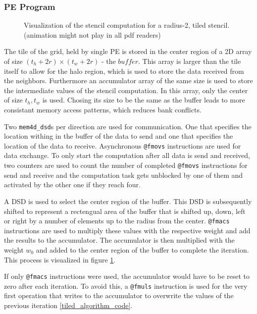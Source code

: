 \documentclass{article}
\begin{document}
\subsubsection{PE Program}

\begin{figure}
    \centering
    \caption{Visualization of the stencil computation for a radius-2, tiled stencil. (animation might not play in all pdf readers)}
    \label{fig:stencil_algorithm_animation}
\end{figure}

The tile of the grid, held by single PE is stored in the center region of a 2D array of size $(t_h+2r)\times (t_w+2r)$ - the $buffer$. This array is larger than the tile itself to allow for the halo region, which is used to store the data received from the neighbors. Furthermore an accumulator array of the same size is used to store the intermediate values of the stencil computation. In this array, only the center of size $t_h, t_w$ is used. Chosing its size to be the same as the buffer leads to more consistant memory access patterns, which reduces bank conflicts.

Two \texttt{mem4d\_dsd}s per direction are used for communication. One that specifies the location withing in the buffer of the data to send and one that specifies the location of the data to receive.
Asynchronous \texttt{@fmovs} instructions are used for data exchange. To only start the computation after all data is send and received, two counters are used to count the number of completed \texttt{@fmovs} instructions for send and receive and the computation task gets unblocked by one of them and activated by the other one if they reach four.

A DSD is used to select the center region of the buffer. This DSD is subsequently shifted to represent a rectengual area of the buffer that is shifted up, down, left or right by a number of elements up to the radius from the center. \texttt{@fmacs} instructions are used to multiply these values with the respective weight and add the results to the accumulator. The accumulator is then multiplied with the weight $w_0$ and added to the center region of the buffer to complete the iteration. This process is visualized in figure \ref{fig:stencil_algorithm_animation}.

If only \texttt{@fmacs} instructions were used, the accumulator would have to be reset to zero after each iteration. To avoid this, a \texttt{@fmuls} instruction is used for the very first operation that writes to the accumulator to overwrite the values of the previous iteration \ref{tiled_algorithm_code}.
\end{document}
